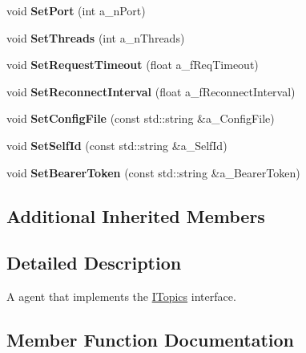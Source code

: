 \begin{DoxyCompactItemize}
void {\bfseries Set\+Port} (int a\+\_\+n\+Port)
\item 
\mbox{\label{class_topic_manager_a99f69d432cb92382f853336842e63710}} 
void {\bfseries Set\+Threads} (int a\+\_\+n\+Threads)
\item 
\mbox{\label{class_topic_manager_af9bc1d3c052117c398a41e8f526ed8c6}} 
void {\bfseries Set\+Request\+Timeout} (float a\+\_\+f\+Req\+Timeout)
\item 
\mbox{\label{class_topic_manager_a6f0f17ecb705a49e89564ab1b7f30a50}} 
void {\bfseries Set\+Reconnect\+Interval} (float a\+\_\+f\+Reconnect\+Interval)
\item 
\mbox{\label{class_topic_manager_a86925b071fcca54a79eacd08ff909041}} 
void {\bfseries Set\+Config\+File} (const std\+::string \&a\+\_\+\+Config\+File)
\item 
\mbox{\label{class_topic_manager_ae8b35f6fc8f1f2f8d2e9d7a1c6928e13}} 
void {\bfseries Set\+Self\+Id} (const std\+::string \&a\+\_\+\+Self\+Id)
\item 
\mbox{\label{class_topic_manager_ab404f67516e6a7b2cf3601909a5f461c}} 
void {\bfseries Set\+Bearer\+Token} (const std\+::string \&a\+\_\+\+Bearer\+Token)
\end{DoxyCompactItemize}
\subsection*{Additional Inherited Members}


\subsection{Detailed Description}
A agent that implements the \hyperlink{class_i_topics}{I\+Topics} interface. 

\subsection{Member Function Documentation}
\mbox{\label{class_topic_manager_a7dd5e9041ac8f297f9695adf576beed0}} 
